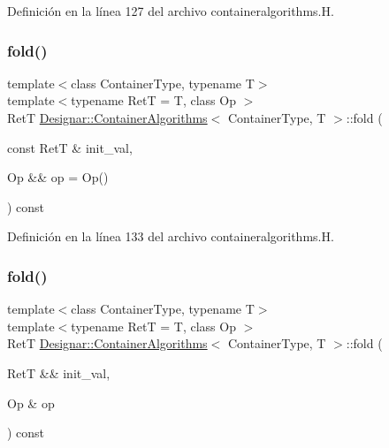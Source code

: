 Definición en la línea 127 del archivo containeralgorithms.\+H.

\mbox{\label{class_designar_1_1_container_algorithms_a410f880dab4f206d3d99b31b0a67637d}} 
\subsubsection{\texorpdfstring{fold()}{fold()}\hspace{0.1cm}{\footnotesize\ttfamily [2/4]}}
{\footnotesize\ttfamily template$<$class Container\+Type, typename T$>$ \\
template$<$typename RetT  = T, class Op $>$ \\
RetT \hyperlink{class_designar_1_1_container_algorithms}{Designar\+::\+Container\+Algorithms}$<$ Container\+Type, T $>$\+::fold (\begin{DoxyParamCaption}\item[{const RetT \&}]{init\+\_\+val,  }\item[{Op \&\&}]{op = {\ttfamily Op()} }\end{DoxyParamCaption}) const\hspace{0.3cm}{\ttfamily [inline]}}



Definición en la línea 133 del archivo containeralgorithms.\+H.

\mbox{\label{class_designar_1_1_container_algorithms_a148e3417520a3253663bd2554cad6c67}} 
\subsubsection{\texorpdfstring{fold()}{fold()}\hspace{0.1cm}{\footnotesize\ttfamily [3/4]}}
{\footnotesize\ttfamily template$<$class Container\+Type, typename T$>$ \\
template$<$typename RetT  = T, class Op $>$ \\
RetT \hyperlink{class_designar_1_1_container_algorithms}{Designar\+::\+Container\+Algorithms}$<$ Container\+Type, T $>$\+::fold (\begin{DoxyParamCaption}\item[{RetT \&\&}]{init\+\_\+val,  }\item[{Op \&}]{op }\end{DoxyParamCaption}) const\hspace{0.3cm}{\ttfamily [inline]}}



